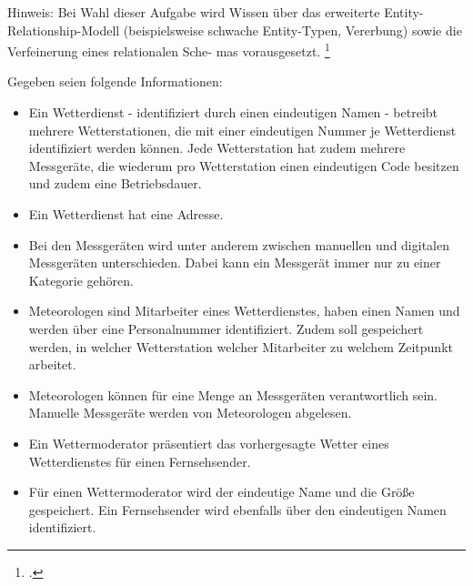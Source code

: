 \documentclass{lehramt-informatik-aufgabe}
\begin{document}

Hinweis: Bei Wahl dieser Aufgabe wird Wissen über das erweiterte Entity-
Relationship-Modell (beispielsweise schwache Entity-Typen, Vererbung)
sowie die Verfeinerung eines relationalen Sche- mas vorausgesetzt.
\footcite{examen:66116:2020:03}

Gegeben seien folgende Informationen:
\begin{itemize}

\item Ein Wetterdienst - identifiziert durch einen eindeutigen Namen -
betreibt mehrere Wetterstationen, die mit einer eindeutigen Nummer je
Wetterdienst identifiziert werden können. Jede Wetterstation hat zudem
mehrere Messgeräte, die wiederum pro Wetterstation einen eindeutigen
Code besitzen und zudem eine Betriebsdauer.

\item Ein Wetterdienst hat eine Adresse.

\item Bei den Messgeräten wird unter anderem zwischen manuellen und
digitalen Messgeräten unterschieden. Dabei kann ein Messgerät immer nur
zu einer Kategorie gehören.

\item Meteorologen sind Mitarbeiter eines Wetterdienstes, haben einen
Namen und werden über eine Personalnummer identifiziert. Zudem soll
gespeichert werden, in welcher Wetterstation welcher Mitarbeiter zu
welchem Zeitpunkt arbeitet.

\item Meteorologen können für eine Menge an Messgeräten verantwortlich
sein. Manuelle Messgeräte werden von Meteorologen abgelesen.

\item Ein Wettermoderator präsentiert das vorhergesagte Wetter eines
Wetterdienstes für einen Fernsehsender.

\item Für einen Wettermoderator wird der eindeutige Name und die Größe
gespeichert. Ein Fernsehsender wird ebenfalls über den eindeutigen
Namen identifiziert.

\end{itemize}
\end{document}
